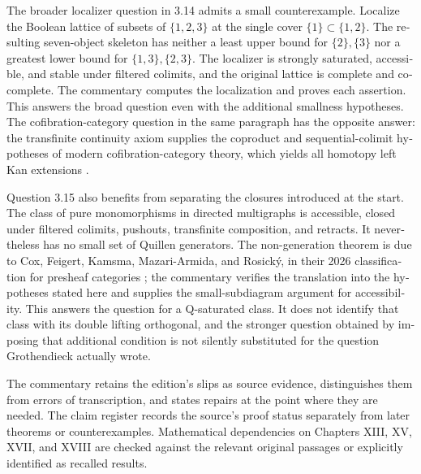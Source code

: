 \begin{otherlanguage}{english}
The broader localizer question in 3.14 admits a small counterexample.
Localize the Boolean lattice of subsets of $\{1,2,3\}$ at the single cover
$\{1\}\subset\{1,2\}$. The resulting seven-object skeleton has neither
a least upper bound for $\{2\},\{3\}$ nor a greatest lower bound for
$\{1,3\},\{2,3\}$. The localizer is strongly saturated, accessible, and
stable under filtered colimits, and the original lattice is complete and
cocomplete. The commentary computes the localization and proves each
assertion. This answers the broad question even with the additional
smallness hypotheses. The cofibration-category question in the same
paragraph has the opposite answer: the transfinite continuity axiom
supplies the coproduct and sequential-colimit hypotheses of modern
cofibration-category theory, which yields all homotopy left Kan
extensions \citep[Theorem 10.3.2]{RadulescuBanu2009}.

Question 3.15 also benefits from separating the closures introduced at the
start. The class of pure monomorphisms in directed multigraphs is accessible,
closed under filtered colimits, pushouts, transfinite composition, and
retracts. It nevertheless has no small set of Quillen generators. The
non-generation theorem is due to Cox, Feigert, Kamsma, Mazari-Armida, and
Rosick\'y, in their 2026 classification for presheaf categories
\citep[Theorem 5.1]{CoxEtAl2026Pure}; the
commentary verifies the translation into the hypotheses stated here and
supplies the small-subdiagram argument for accessibility. This answers the
question for a Q-saturated class. It does not identify that class with its
double lifting orthogonal, and the stronger question obtained by imposing
that additional condition is not silently substituted for the question
Grothendieck actually wrote.

\medskip
The commentary retains the edition's slips as source evidence, distinguishes
them from errors of transcription, and states repairs at the
point where they are needed. The claim register records the source's proof
status separately from later theorems or counterexamples. Mathematical
dependencies on Chapters XIII, XV, XVII, and XVIII are checked against
the relevant original passages or explicitly identified as recalled results.

\endgroup
\end{otherlanguage}
\dgrchunkend
